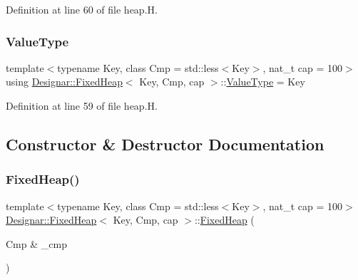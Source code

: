 Definition at line 60 of file heap.\+H.

\mbox{\label{class_designar_1_1_fixed_heap_a33def2622f3d95c165abf62ce2edcb73}} 
\subsubsection{\texorpdfstring{Value\+Type}{ValueType}}
{\footnotesize\ttfamily template$<$typename Key, class Cmp = std\+::less$<$\+Key$>$, nat\+\_\+t cap = 100$>$ \\
using \hyperlink{class_designar_1_1_fixed_heap}{Designar\+::\+Fixed\+Heap}$<$ Key, Cmp, cap $>$\+::\hyperlink{class_designar_1_1_fixed_heap_a33def2622f3d95c165abf62ce2edcb73}{Value\+Type} =  Key}



Definition at line 59 of file heap.\+H.



\subsection{Constructor \& Destructor Documentation}
\mbox{\label{class_designar_1_1_fixed_heap_ac5dfd33a9ee1cedaad907c51afdf351d}} 
\subsubsection{\texorpdfstring{Fixed\+Heap()}{FixedHeap()}\hspace{0.1cm}{\footnotesize\ttfamily [1/4]}}
{\footnotesize\ttfamily template$<$typename Key, class Cmp = std\+::less$<$\+Key$>$, nat\+\_\+t cap = 100$>$ \\
\hyperlink{class_designar_1_1_fixed_heap}{Designar\+::\+Fixed\+Heap}$<$ Key, Cmp, cap $>$\+::\hyperlink{class_designar_1_1_fixed_heap}{Fixed\+Heap} (\begin{DoxyParamCaption}\item[{Cmp \&}]{\+\_\+cmp }\end{DoxyParamCaption})\hspace{0.3cm}{\ttfamily [inline]}}



